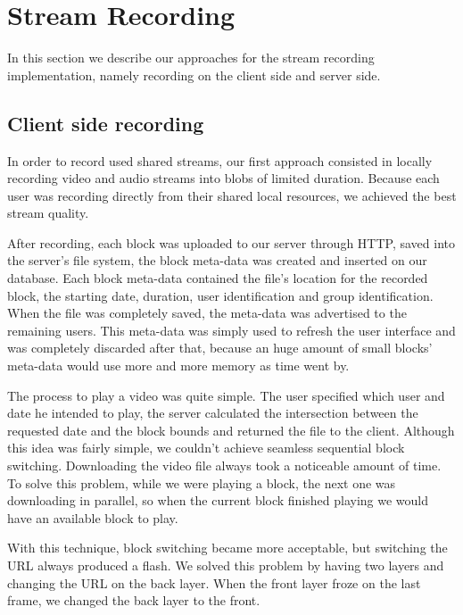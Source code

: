 \section{Stream Recording}
In this section we describe our approaches for the stream recording implementation, namely recording on the client side and server side.

\subsection{Client side recording}
In order to record used shared streams, our first approach consisted in locally recording video and audio streams into blobs of limited duration. Because each user was recording directly from their shared local resources, we achieved the best stream quality.

After recording, each block was uploaded to our server through \ac{HTTP}, saved into the server's file system, the block meta-data was created and inserted on our database. Each block meta-data contained the file's location for the recorded block, the starting date, duration, user identification and group identification.
When the file was completely saved, the meta-data was advertised to the remaining users. This meta-data was simply used to refresh the user interface and was completely discarded after that, because an huge amount of small blocks' meta-data would use more and more memory as time went by. 

	The process to play a video was quite simple. The user specified which user and date he intended to play, the server calculated the intersection between the requested date and the block bounds and returned the file to the client.
	Although this idea was fairly simple, we couldn't achieve seamless sequential block switching. Downloading the video file always took a noticeable amount of time. To solve this problem, while we were playing a block, the next one was downloading in parallel, so when the current block finished playing we would have an available block to play. 

        With this technique, block switching became more acceptable, but switching the \ac{URL} always produced a flash. We solved this problem by having two layers and changing the \ac{URL} on the back layer. When the front layer froze on the last frame, we changed the back layer to the front. 

